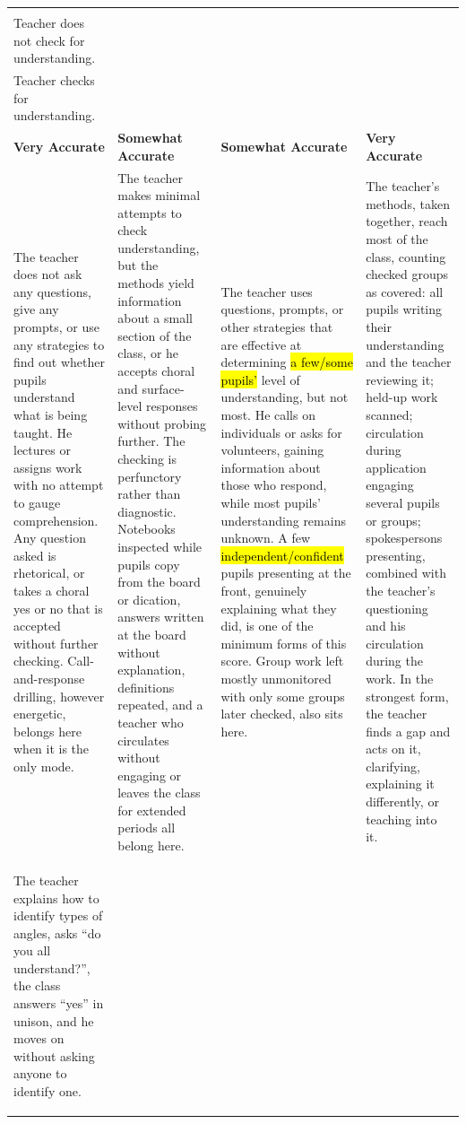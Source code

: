 \documentclass[10pt,a4paper]{article}
\makeatletter
\newcommand{\exlistsize}{\scriptsize}
\renewcommand{\arraystretch}{1.25}
\newlength{\gridw}\newlength{\stemw}\newlength{\stemh}\newlength{\stemtop}
\newcommand{\stemrow}[2]{%
  \setlength{\stemtop}{1.15\ht\strutbox}%
  \setlength{\stemw}{0.5\dimexpr\gridw-2\arrayrulewidth\relax}%
  \sbox{\stemAbox}{\begin{minipage}[t]{\dimexpr\stemw-4.4mm\relax}\RaggedRight
      \footnotesize\textbf{Column A}\\#1\end{minipage}}%
  \sbox{\stemBbox}{\begin{minipage}[t]{\dimexpr\stemw-4.4mm\relax}\RaggedRight
      \footnotesize\textbf{Column B}\\#2\end{minipage}}%
  \setlength{\stemh}{\dimexpr\ht\stemAbox+\dp\stemAbox\relax}%
  \ifdim\dimexpr\ht\stemBbox+\dp\stemBbox\relax>\stemh
    \setlength{\stemh}{\dimexpr\ht\stemBbox+\dp\stemBbox\relax}\fi
  \setlength{\stemh}{\dimexpr\stemtop+\stemh+2.6mm\relax}%
  \begin{tikzpicture}[inner sep=0pt,outer sep=0pt,baseline=0pt]
    \shade[left color=gradA,middle color=gradM,right color=gradB]
      (0,\stemtop) rectangle (\dimexpr\gridw-2\arrayrulewidth\relax,
                              \dimexpr\stemtop-\stemh\relax);
    \draw[black,line width=\arrayrulewidth]
      (\stemw,\stemtop) -- (\stemw,\dimexpr\stemtop-\stemh\relax);
    \node[anchor=north west] at (2.2mm,\dimexpr\stemtop-1.2mm\relax)
      {\usebox{\stemAbox}};
    \node[anchor=north west] at (\dimexpr\stemw+2.2mm\relax,
                                 \dimexpr\stemtop-1.2mm\relax)
      {\usebox{\stemBbox}};
  \end{tikzpicture}}
\newcommand{\scoregrid}[4]{%
  \setlength{\gridw}{\linewidth}%
  \renewcommand{\arraystretch}{1.06}%
  \noindent\footnotesize
  \begin{tabularx}{\linewidth}{|>{\RaggedRight\arraybackslash}X
                               |>{\RaggedRight\arraybackslash}X
                               |>{\RaggedRight\arraybackslash}X
                               |>{\RaggedRight\arraybackslash}X|}
  \hline
  \multicolumn{4}{|@{}l@{}|}{\stemrow{#1}{#2}}\\
  \hline
  \rowcolor{tsub}
  \centering\arraybackslash\textbf{Very Accurate} &
  \centering\arraybackslash\textbf{Somewhat Accurate} &
  \centering\arraybackslash\textbf{Somewhat Accurate} &
  \centering\arraybackslash\textbf{Very Accurate}\\
  \hline
  #3\\
  \hline
  \rowcolor{texfill} #4\\
  \hline
  \end{tabularx}\normalsize}
\makeatother
\begin{document}
\scoregrid{Teacher does not check for understanding.}%
          {Teacher checks for understanding.}{%
\footnotesize The teacher does not ask any questions, give any prompts, or use any strategies to find out
whether pupils understand what is being taught. He lectures or assigns work with no attempt to gauge
comprehension. Any question asked is rhetorical, or takes a choral yes or no that is accepted without
further checking. Call-and-response drilling, however energetic, belongs here when it is the only mode. &
\footnotesize The teacher makes minimal attempts to check understanding, but the methods yield information
about a small section of the class, or he accepts choral and surface-level responses without probing further.
The checking is perfunctory rather than diagnostic. Notebooks inspected while pupils copy from the board or dication,
answers written at the board without explanation, definitions repeated, and a teacher who circulates without
engaging or leaves the class for extended periods all belong here. &
\footnotesize The teacher uses questions, prompts, or other strategies that are effective at determining \hl{a %
few/some pupils'} level of understanding, but not most. He calls on individuals or asks for volunteers, gaining
information about those who respond, while most pupils' understanding remains unknown. A few \hl{independent/confident} %
pupils presenting at the front, genuinely explaining what they did, is one of the minimum forms of this
score. Group work left mostly unmonitored with only some groups later checked, also sits here. & 
\footnotesize The teacher's methods, taken together, reach most of the class, counting checked groups as
covered: all pupils writing their understanding and the teacher reviewing it; held-up work scanned;
circulation during application engaging several pupils or groups; spokespersons presenting, combined with
the teacher's questioning and his circulation during the work. In the strongest form, the teacher finds a
gap and acts on it, clarifying, explaining it differently, or teaching into it.
}{%
\exlistsize\begin{exlist}
  \item The teacher explains how to identify types of angles, asks ``do you all understand?'', the class
        answers ``yes'' in unison, and he moves on without asking anyone to identify one.

\end{exlist}}
\end{document}
